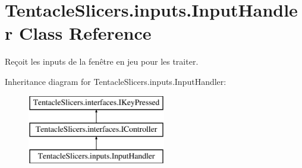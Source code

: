 \hypertarget{class_tentacle_slicers_1_1inputs_1_1_input_handler}{}\section{Tentacle\+Slicers.\+inputs.\+Input\+Handler Class Reference}
\label{class_tentacle_slicers_1_1inputs_1_1_input_handler}


Reçoit les inputs de la fenêtre en jeu pour les traiter.  


Inheritance diagram for Tentacle\+Slicers.\+inputs.\+Input\+Handler\+:\begin{figure}[H]
\begin{center}
\leavevmode
\includegraphics[height=3.000000cm]{class_tentacle_slicers_1_1inputs_1_1_input_handler}
\end{center}
\end{figure}
